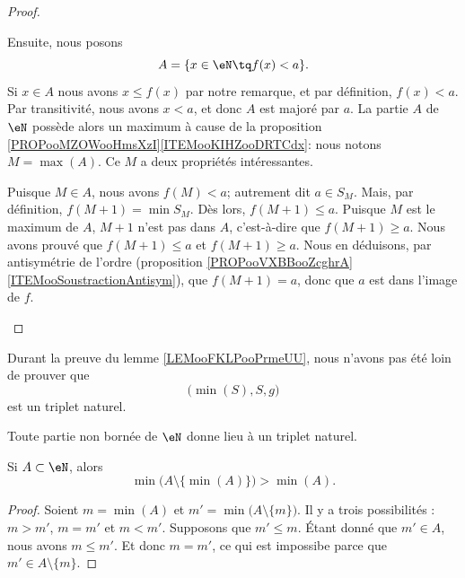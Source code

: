 \begin{proof}
\begin{subproof}
  		Ensuite, nous posons
		\begin{equation}
			A=\{ x\in \eN\tq f(x)<a \}.
		\end{equation}
  		Si \( x\in A\) nous avons \( x\leq f(x) \) par notre remarque, et par définition, \( f(x) <a\). Par transitivité, nous avons \( x < a \), et donc \( A \) est majoré par \( a \). La partie \( A\) de \( \eN\) possède alors un maximum à cause de la proposition \ref{PROPooMZOWooHmsXzI}\ref{ITEMooKIHZooDRTCdx}: nous notons \( M=\max(A)\). Ce \( M\) a deux propriétés intéressantes.
		\begin{subproof}
			\spitem[D'abord]
			Puisque \( M\in A\), nous avons \( f(M)<a\); autrement dit \( a \in S_M \). Mais, par définition, \( f(M+1)=\min S_M\). Dès lors, \( f(M+1)\leq a\).
			\spitem[Ensuite]
			Puisque \( M\) est le maximum de \( A\), \( M+1\) n'est pas dans \( A\), c'est-à-dire que \( f(M+1)\geq a\).
			Nous avons prouvé que \( f(M+1)\leq a\) et \( f(M+1)\geq a\). Nous en déduisons, par antisymétrie de l'ordre (proposition \ref{PROPooVXBBooZcghrA}\ref{ITEMooSoustractionAntisym}), que \( f(M+1)=a\), donc que \( a \) est dans l'image de \( f \).
		\end{subproof}
	\end{subproof}
\end{proof}

\begin{normaltext}      \label{NORMooQXASooMXqhjI}
	Durant la preuve du lemme \ref{LEMooFKLPooPrmeUU}, nous n'avons pas été loin de prouver que
	\begin{equation}
		\big( \min(S),S,g \big)
	\end{equation}
	est un triplet naturel.

	Toute partie non bornée de \( \eN\) donne lieu à un triplet naturel.
\end{normaltext}



\begin{lemma}	\label{LEMooLDKQooSTiVlW}
	Si \( A\subset \eN\), alors
	\begin{equation}
		\min\big( A\setminus\{ \min(A) \} \big)>\min(A).
	\end{equation}
\end{lemma}

\begin{proof}
	Soient \( m=\min(A)\) et \( m'=\min\big( A\setminus\{ m \} \big)\). Il y a trois possibilités : \( m>m'\), \( m=m'\) et \( m<m'\). Supposons que \( m'\leq m\). Étant donné que \( m'\in A\), nous avons \( m\leq m'\). Et donc \( m=m'\), ce qui est impossibe parce que \( m'\in A\setminus\{ m \}\).
\end{proof}


